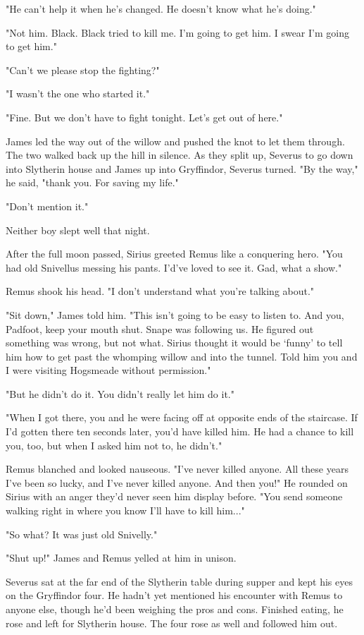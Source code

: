 "He can't help it when he's changed. He doesn't know what he's doing."

"Not him. Black. Black tried to kill me. I'm going to get him. I swear I'm going to get him."

"Can't we please stop the fighting?"

"I wasn't the one who started it."

"Fine. But we don't have to fight tonight. Let's get out of here."

James led the way out of the willow and pushed the knot to let them through. The two walked back up the hill in silence. As they split up, Severus to go down into Slytherin house and James up into Gryffindor, Severus turned. "By the way," he said, "thank you. For saving my life."

"Don't mention it."

Neither boy slept well that night.

After the full moon passed, Sirius greeted Remus like a conquering hero. "You had old Snivellus messing his pants. I'd've loved to see it. Gad, what a show."

Remus shook his head. "I don't understand what you're talking about."

"Sit down," James told him. "This isn't going to be easy to listen to. And you, Padfoot, keep your mouth shut. Snape was following us. He figured out something was wrong, but not what. Sirius thought it would be `funny' to tell him how to get past the whomping willow and into the tunnel. Told him you and I were visiting Hogsmeade without permission."

"But he didn't do it. You didn't really let him do it."

"When I got there, you and he were facing off at opposite ends of the staircase. If I'd gotten there ten seconds later, you'd have killed him. He had a chance to kill you, too, but when I asked him not to, he didn't."

Remus blanched and looked nauseous. "I've never killed anyone. All these years I've been so lucky, and I've never killed anyone. And then you!" He rounded on Sirius with an anger they'd never seen him display before. "You send someone walking right in where you know I'll have to kill him..."

"So what? It was just old Snivelly."

"Shut up!" James and Remus yelled at him in unison.

Severus sat at the far end of the Slytherin table during supper and kept his eyes on the Gryffindor four. He hadn't yet mentioned his encounter with Remus to anyone else, though he'd been weighing the pros and cons. Finished eating, he rose and left for Slytherin house. The four rose as well and followed him out.

